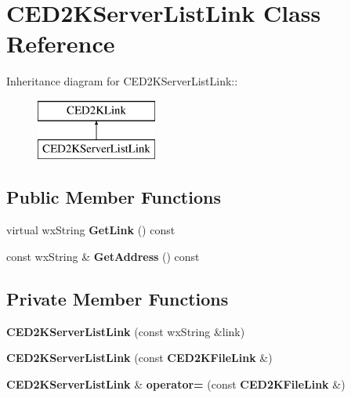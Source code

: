 \section{CED2KServerListLink Class Reference}
\label{classCED2KServerListLink}
Inheritance diagram for CED2KServerListLink::\begin{figure}[H]
\begin{center}
\leavevmode
\includegraphics[height=2cm]{classCED2KServerListLink}
\end{center}
\end{figure}
\subsection*{Public Member Functions}
\begin{DoxyCompactItemize}
\item 
virtual wxString {\bfseries GetLink} () const \label{classCED2KServerListLink_af7cd404a4f395a34d2272a1eb56da44d}

\item 
const wxString \& {\bfseries GetAddress} () const \label{classCED2KServerListLink_a855aa40ec06e5315b2ca98ddabe044fa}

\end{DoxyCompactItemize}
\subsection*{Private Member Functions}
\begin{DoxyCompactItemize}
\item 
{\bfseries CED2KServerListLink} (const wxString \&link)\label{classCED2KServerListLink_a2a4cb1fd2ca50c90a1c7ca5c3c943156}

\item 
{\bfseries CED2KServerListLink} (const {\bf CED2KFileLink} \&)\label{classCED2KServerListLink_a39849d7a3f2ce751d4b32074d67ea858}

\item 
{\bf CED2KServerListLink} \& {\bfseries operator=} (const {\bf CED2KFileLink} \&)\label{classCED2KServerListLink_ab96d60bcb5363cdc16235f51ae0ce6f4}

\end{DoxyCompactItemize}
